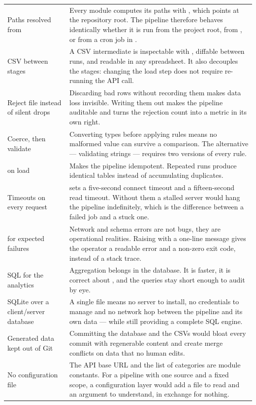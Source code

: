 \noindent
\begin{tabularx}{\textwidth}{@{}L{5.0cm}Y@{}}
 &  \\
\midrule
Paths resolved from  &
Every module computes its paths with
, which points at the
repository root. The pipeline therefore behaves identically whether it is
run from the project root, from , or from a cron job in
\cpath{/}. \\
\addlinespace
CSV between stages &
A CSV intermediate is inspectable with , diffable between runs,
and readable in any spreadsheet. It also decouples the stages: changing the
load step does not require re-running the API call. \\
\addlinespace
Reject file instead of silent drops &
Discarding bad rows without recording them makes data loss invisible.
Writing them out makes the pipeline auditable and turns the rejection count
into a metric in its own right. \\
\addlinespace
Coerce, then validate &
Converting types before applying rules means no malformed value can survive
a comparison. The alternative --- validating strings --- requires two
versions of every rule. \\
\addlinespace
{} on load &
Makes the pipeline idempotent. Repeated runs produce identical tables
instead of accumulating duplicates. \\
\addlinespace
Timeouts on every request &
 sets a five-second connect timeout and a
fifteen-second read timeout. Without them a stalled server would hang the
pipeline indefinitely, which is the difference between a failed job and a
stuck one. \\
\addlinespace
{} for expected failures &
Network and schema errors are not bugs, they are operational realities.
Raising  with a one-line message gives the operator a
readable error and a non-zero exit code, instead of a stack trace. \\
\addlinespace
SQL for the analytics &
Aggregation belongs in the database. It is faster, it is correct about
, and the queries stay short enough to audit by eye. \\
\addlinespace
SQLite over a client/server database &
A single file means no server to install, no credentials to manage and no
network hop between the pipeline and its own data --- while still providing
a complete SQL engine. \\
\addlinespace
Generated data kept out of Git &
Committing the database and the CSVs would bloat every commit with
regenerable content and create merge conflicts on data that no human
edits. \\
\addlinespace
No configuration file &
The API base URL and the list of categories are module constants. For a
pipeline with one source and a fixed scope, a configuration layer would add
a file to read and an argument to understand, in exchange for nothing. \\
\end{tabularx}

